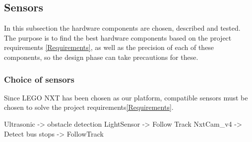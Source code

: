 \subsection{Sensors}
In this subsection the hardware components are chosen, described and tested. The purpose is to find the best hardware components based on the project requirements \ref{Requirements}, as well as the precision of each of these components, so the design phase can take precautions for these. 


\subsubsection{Choice of sensors}
Since LEGO NXT has been chosen as our platform, compatible sensors must be chosen to solve the project requirements\ref{Requirements}.

Ultrasonic -> obstacle detection
LightSensor -> Follow Track
NxtCam\_v4 -> Detect bus stops -> FollowTrack








